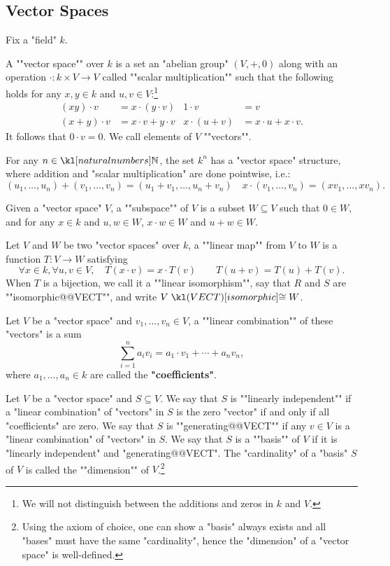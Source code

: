 \documentclass[main.tex]{subfiles}
\begin{document}
\subsection{Vector Spaces}
Fix a "field" $k$.
\begin{defn}
	\AP A ""vector space"" over $k$ is a set an "abelian group" $(V,+,0)$ along with an operation $\cdot : k\times V \rightarrow V$ called ""scalar multiplication"" such that the following holds for any $x,y \in k$ and $u,v \in V$:\footnote{We will not distinguish between the additions and zeros in $k$ and $V$.}
	\begin{align*}
		(xy)\cdot v &= x\cdot (y\cdot v) &1\cdot v &= v\\
		(x+y)\cdot v&= x\cdot v + y \cdot v &x\cdot (u+v) &= x\cdot u + x \cdot v.
	\end{align*}
	It follows that $0\cdot v = 0$. \AP We call elements of $V$ ""vectors"".
\end{defn}
\begin{exmp}
	For any $n \in \N$, the set $k^n$ has a "vector space" structure, where addition and "scalar multiplication" are done pointwise, i.e.:
	\[(u_1,\dots, u_n)+ (v_1,\dots, v_n) = (u_1+v_1,\dots, u_n+v_n)\quad x\cdot (v_1,\dots, v_n) = (xv_1,\dots, xv_n).\]
\end{exmp}
\begin{defn}[Subspace]
	\AP Given a "vector space" $V$, a ""subspace"" of $V$ is a subset $W \subseteq V$ such that $0 \in W$, and for any $x \in k$ and $u,w \in W$, $x \cdot w \in W$ and $u+w \in W$.
\end{defn}
\begin{defn}
	\AP Let $V$ and $W$ be two "vector spaces" over $k$, a ""linear map"" from $V$ to $W$ is a function $T: V \rightarrow W$ satisfying
	\[\forall x \in k, \forall u,v \in V, \quad T(x\cdot v) = x \cdot T(v) \qquad T(u+v) = T(u)+T(v).\]
	\AP When $T$ is a bijection, we call it a ""linear isomorphism"", say that $R$ and $S$ are ""isomorphic@@VECT"", and write $V \isoVECT W$.
\end{defn}
\begin{defn}
	\AP Let $V$ be a "vector space" and $v_1,\dots, v_n \in V$, a ""linear combination"" of these "vectors" is a sum \[\sum_{i=1}^n a_iv_i = a_1\cdot v_1 +\cdots + a_nv_n,\]
	where $a_1,\dots, a_n \in k$ are called the \textbf{"coefficients"}.
\end{defn}
\begin{defn}[Basis]
	Let $V$ be a "vector space" and $S\subseteq V$. \AP We say that $S$ is ""linearly independent"" if a "linear combination" of "vectors" in $S$ is the zero "vector" if and only if all "coefficients" are zero. \AP We say that $S$ is ""generating@@VECT"" if any $v \in V$ is a "linear combination" of "vectors" in $S$. \AP We say that $S$ is a ""basis"" of $V$ if it is "linearly independent" and "generating@@VECT". \AP The "cardinality" of a "basis" $S$ of $V$ is called the ""dimension"" of $V$.\footnote{Using the axiom of choice, one can show a "basis" always exists and all "bases" must have the same "cardinality", hence the "dimension" of a "vector space" is well-defined.}
\end{defn}
\end{document}
